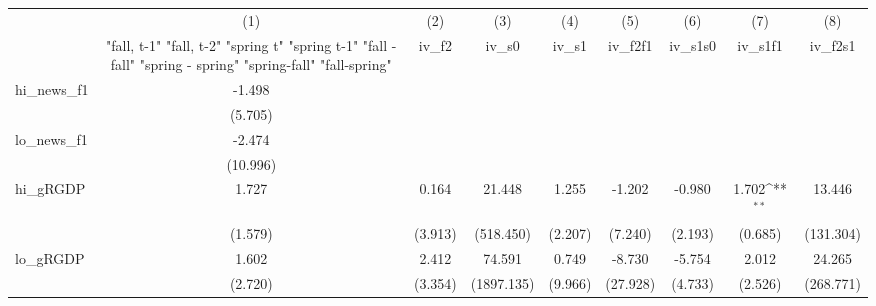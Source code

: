 {
\def\sym#1{\ifmmode^{#1}\else\(^{#1}\)\fi}
\begin{tabular}{l*{8}{c}}
\toprule
            &\multicolumn{1}{c}{(1)}&\multicolumn{1}{c}{(2)}&\multicolumn{1}{c}{(3)}&\multicolumn{1}{c}{(4)}&\multicolumn{1}{c}{(5)}&\multicolumn{1}{c}{(6)}&\multicolumn{1}{c}{(7)}&\multicolumn{1}{c}{(8)}\\
            &\multicolumn{1}{c}{  "fall, t-1" "fall, t-2" "spring t" "spring t-1"  "fall - fall" "spring - spring" "spring-fall" "fall-spring" }&\multicolumn{1}{c}{iv\_f2}&\multicolumn{1}{c}{iv\_s0}&\multicolumn{1}{c}{iv\_s1}&\multicolumn{1}{c}{iv\_f2f1}&\multicolumn{1}{c}{iv\_s1s0}&\multicolumn{1}{c}{iv\_s1f1}&\multicolumn{1}{c}{iv\_f2s1}\\
\midrule
hi\_news\_f1  &      -1.498         &                     &                     &                     &                     &                     &                     &                     \\
            &     (5.705)         &                     &                     &                     &                     &                     &                     &                     \\
\addlinespace
lo\_news\_f1  &      -2.474         &                     &                     &                     &                     &                     &                     &                     \\
            &    (10.996)         &                     &                     &                     &                     &                     &                     &                     \\
\addlinespace
hi\_gRGDP    &       1.727         &       0.164         &      21.448         &       1.255         &      -1.202         &      -0.980         &       1.702\sym{**} &      13.446         \\
            &     (1.579)         &     (3.913)         &   (518.450)         &     (2.207)         &     (7.240)         &     (2.193)         &     (0.685)         &   (131.304)         \\
\addlinespace
lo\_gRGDP    &       1.602         &       2.412         &      74.591         &       0.749         &      -8.730         &      -5.754         &       2.012         &      24.265         \\
            &     (2.720)         &     (3.354)         &  (1897.135)         &     (9.966)         &    (27.928)         &     (4.733)         &     (2.526)         &   (268.771)         \\

\end{tabular}}
